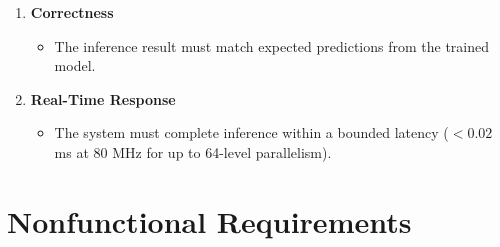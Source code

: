 \documentclass[a4paper,12pt]{report}
\begin{document}
\begin{enumerate}[label=(\roman*)]
    \item \textbf{Correctness}
    \begin{itemize}
        \item The inference result must match expected predictions from the trained model.
    \end{itemize}
    
    \item \textbf{Real-Time Response}
    \begin{itemize}
        \item The system must complete inference within a bounded latency ($<0.02$ ms at 80 MHz for up to 64-level parallelism).
    \end{itemize}
\end{enumerate}

\clearpage
\section{Nonfunctional Requirements}
\end{document}
